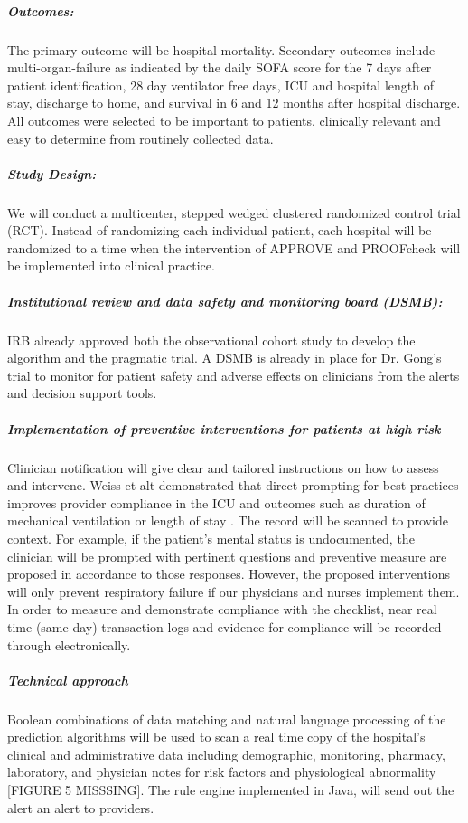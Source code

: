 \documentclass[11pt,notitlepage]{article}
\begin{document}
\subparagraph*{Outcomes:}
The primary outcome will be hospital mortality. Secondary outcomes include multi-organ-failure as indicated by the daily SOFA score for the 7 days after patient identification, 28 day ventilator free days, ICU and hospital length of stay, discharge to home, and survival in 6 and 12 months after hospital discharge. All outcomes were selected to be important to patients, clinically relevant and easy to determine from routinely collected data.

\subparagraph*{Study Design:}
We will conduct a multicenter, stepped wedged clustered randomized control trial (RCT). Instead of randomizing each individual patient, each hospital will be randomized to a time when the intervention of APPROVE and PROOFcheck will be implemented into clinical practice.

\subparagraph*{Institutional review and data safety and monitoring board (DSMB):} IRB already approved both the observational cohort study to develop the algorithm and the pragmatic trial. A DSMB is already in place for Dr. Gong's trial to monitor for patient safety and adverse effects on clinicians from the alerts and decision support tools.

\subparagraph*{Implementation of preventive interventions for patients at high risk}
Clinician  notification will give clear and tailored instructions on how to assess and intervene. Weiss et alt demonstrated that direct prompting for best practices improves provider compliance in the ICU and outcomes such as duration of mechanical ventilation or length of stay \cite{Weiss_21616996}. The record will be scanned to provide context. For example, if the patient's mental status is undocumented, the clinician will be prompted with pertinent questions and preventive measure are proposed in accordance to those responses. However, the proposed interventions will only prevent respiratory failure if our physicians and nurses implement them. In order to measure and demonstrate compliance with the checklist, near real time (same day) transaction logs and evidence for compliance will be recorded through electronically. 

\subparagraph*{Technical approach}
Boolean combinations of data matching and natural language processing of the prediction algorithms will be used to scan a real time copy of the hospital's clinical and administrative data including demographic, monitoring, pharmacy, laboratory, and physician notes for risk factors and physiological abnormality [FIGURE 5 MISSSING]. The rule engine implemented in Java, will send out the alert an alert to providers.
\end{document}
